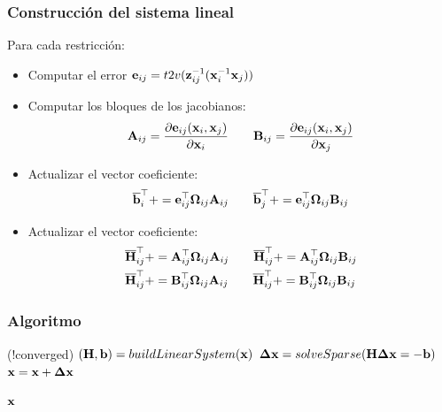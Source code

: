 \begin{frame}
    \frametitle{Construcción del sistema lineal}
    Para cada restricción:
    \begin{itemize}
        \item Computar el error $\boldsymbol{\mathbf{e}}_{ij} = t2v({\boldsymbol{\mathbf{z}}}^{-1}_{ij}({\boldsymbol{\mathbf{x}}}^{-1}_{i}\boldsymbol{\mathbf{x}}_{j}))$
        \item Computar los bloques de los jacobianos:
            \begin{equation*}
                \boldsymbol{\mathbf{A}}_{ij} = \dfrac{\partial\boldsymbol{\mathbf{e}}_{ij}(\boldsymbol{\mathbf{x}}_{i}, \boldsymbol{\mathbf{x}}_{j})}{\partial\boldsymbol{\mathbf{x}}_{i}} \quad \quad \boldsymbol{\mathbf{B}}_{ij} = \dfrac{\partial\boldsymbol{\mathbf{e}}_{ij}(\boldsymbol{\mathbf{x}}_{i}, \boldsymbol{\mathbf{x}}_{j})}{\partial\boldsymbol{\mathbf{x}}_{j}}
            \end{equation*}
    \item Actualizar el vector coeficiente:
        \begin{equation*}
            \overline{\boldsymbol{\mathbf{b}}}_{i}^{\top} += \boldsymbol{\mathbf{e}}_{ij}^{\top}\boldsymbol{\mathbf{\Omega}}_{ij}\boldsymbol{\mathbf{A}}_{ij} \quad \quad \overline{\boldsymbol{\mathbf{b}}}_{j}^{\top} += \boldsymbol{\mathbf{e}}_{ij}^{\top}\boldsymbol{\mathbf{\Omega}}_{ij}\boldsymbol{\mathbf{B}}_{ij}
        \end{equation*}

    \item Actualizar el vector coeficiente:
        \begin{align*}
            \overline{\boldsymbol{\mathbf{H}}}_{ij}^{\top} &+= \boldsymbol{\mathbf{A}}_{ij}^{\top}\boldsymbol{\mathbf{\Omega}}_{ij}\boldsymbol{\mathbf{A}}_{ij} \quad \quad \overline{\boldsymbol{\mathbf{H}}}_{ij}^{\top} += \boldsymbol{\mathbf{A}}_{ij}^{\top}\boldsymbol{\mathbf{\Omega}}_{ij}\boldsymbol{\mathbf{B}}_{ij} \\
            \overline{\boldsymbol{\mathbf{H}}}_{ij}^{\top} &+= \boldsymbol{\mathbf{B}}_{ij}^{\top}\boldsymbol{\mathbf{\Omega}}_{ij}\boldsymbol{\mathbf{A}}_{ij} \quad \quad \overline{\boldsymbol{\mathbf{H}}}_{ij}^{\top} += \boldsymbol{\mathbf{B}}_{ij}^{\top}\boldsymbol{\mathbf{\Omega}}_{ij}\boldsymbol{\mathbf{B}}_{ij}
        \end{align*}
    \end{itemize}    
    
\end{frame}

\begin{frame}
    \frametitle{Algoritmo}
    
    \begin{algorithmic}[1]
        \While (!converged)
        \State $(\boldsymbol{\mathbf{H}},\boldsymbol{\mathbf{b}}) = buildLinearSystem(\boldsymbol{\mathbf{x}})$
        \State $\boldsymbol{\mathbf{\Delta}}\boldsymbol{\mathbf{x}} = solveSparse(\boldsymbol{\mathbf{H}}\boldsymbol{\mathbf{\Delta}}\boldsymbol{\mathbf{x}} = -\boldsymbol{\mathbf{b}})$
        \State $\boldsymbol{\mathbf{x}} = \boldsymbol{\mathbf{x}} + \boldsymbol{\mathbf{\Delta}}\boldsymbol{\mathbf{x}}$
        \EndWhile

        \State \Return $\boldsymbol{\mathbf{x}}$
        \EndProcedure
    \end{algorithmic}
    
\end{frame}


